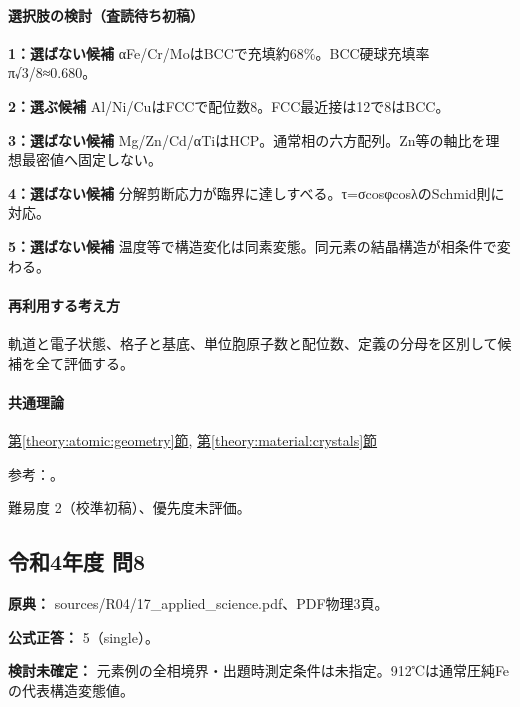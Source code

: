\paragraph{選択肢の検討（査読待ち初稿）}\mbox{}\par

\noindent\textbf{1：選ばない候補} αFe/Cr/MoはBCCで充填約68\%。BCC硬球充填率π√3/8≈0.680。\par

\noindent\textbf{2：選ぶ候補} Al/Ni/CuはFCCで配位数8。FCC最近接は12で8はBCC。\par

\noindent\textbf{3：選ばない候補} Mg/Zn/Cd/αTiはHCP。通常相の六方配列。Zn等の軸比を理想最密値へ固定しない。\par

\noindent\textbf{4：選ばない候補} 分解剪断応力が臨界に達しすべる。τ=σcosφcosλのSchmid則に対応。\par

\noindent\textbf{5：選ばない候補} 温度等で構造変化は同素変態。同元素の結晶構造が相条件で変わる。\par

\paragraph{再利用する考え方} 軌道と電子状態、格子と基底、単位胞原子数と配位数、定義の分母を区別して候補を全て評価する。

\paragraph{共通理論} \hyperref[theory:atomic:geometry]{第\ref*{theory:atomic:geometry}節}, \hyperref[theory:material:crystals]{第\ref*{theory:material:crystals}節}

\par 参考：\cite{openstax_crystals}。

\par 難易度 2（校準初稿）、優先度未評価。

\subsection{令和4年度 問8}
\label{q:r04-reg-applied-08}

\noindent\textbf{原典：} sources/R04/17\_applied\_science.pdf、PDF物理3頁。

\textbf{公式正答：} 5（single）。

\par\textbf{検討未確定：} 元素例の全相境界・出題時測定条件は未指定。912℃は通常圧純Feの代表構造変態値。

